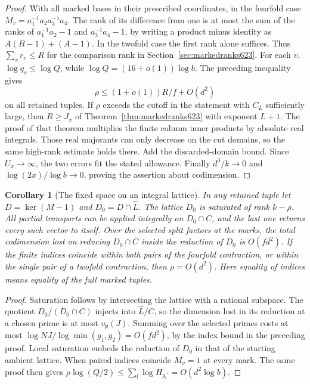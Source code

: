 \documentclass[a4paper,11pt]{article}
\newtheorem{corollary}[proposition]{Corollary}
\theoremstyle{definition}
\theoremstyle{remark}
\numberwithin{equation}{section}
\begin{document}
\begin{proof}
With all marked bases in their prescribed coordinates, in the
fourfold case \(M_v=a_1^{-1}a_2a_3^{-1}a_4\). The rank of its
difference from one is at most the sum of the ranks of
\(a_1^{-1}a_2-1\) and \(a_3^{-1}a_4-1\), by writing a product
minus identity as \(A(B-1)+(A-1)\). In the twofold case the
first rank alone suffices. Thus \(\sum_v r_v\le R\) for the
comparison rank in Section~\ref{sec:markedranks623}. For each
\(v\), \(\log q_v\le\log Q\), while
\(\log Q=(16+o(1))\log b\). The preceding inequality gives
\[
                 \rho\le (1+o(1))R/f+O(d^2)
\]
on all retained tuples. If \(\rho\) exceeds the cutoff in the
statement with \(C_L\) sufficiently large, then \(R\ge J_x\)
of Theorem~\ref{thm:markedranks623} with exponent \(L+1\).
The proof of that theorem multiplies the finite column inner
products by absolute real integrals. Those real majorants can
only decrease on the cut domains, so the same high-rank estimate
holds there. Add the discarded-domain bound. Since \(U_x\to\infty\),
the two errors fit the stated allowance. Finally \(d^3/k\to0\)
and \(\log(2x)/\log b\to0\), proving the assertion about codimension.
\end{proof}

\begin{corollary}[The fixed space on an integral lattice]
\leavevmode\label{cor:rationalfixed629}
In any retained tuple let \(D=\ker(M-1)\) and
\(D_0=D\cap\widehat L\). The lattice \(D_0\) is saturated of
rank \(k-\rho\). All partial transports can be applied integrally
on \(D_0\cap C\), and the last one returns every such vector to
itself. Over the selected split factors at the marks, the total
codimension lost on reducing \(D_0\cap C\) inside the reduction
of \(D_0\) is \(O(fd^2)\). If the finite indices coincide within
both pairs of the fourfold contraction, or within the single pair
of a twofold contraction, then \(\rho=O(d^2)\). Here equality
of indices means equality of the full marked tuples.
\end{corollary}
\begin{proof}
Saturation follows by intersecting the lattice with a rational
subspace. The quotient \(D_0/(D_0\cap C)\) injects into
\(\widehat L/C\), so the dimension lost in its reduction at a
chosen prime is at most \(v_\mathfrak p(J)\). Summing over the
selected primes costs at most
\(\log N J/\log\min(g_1,g_2)=O(fd^2)\), by the index bound in
the preceding proof. Local saturation embeds the reduction of
\(D_0\) in that of the starting ambient lattice. When paired
indices coincide \(M_v=1\) at every mark. The same proof then
gives \(\rho\log(Q/2)\le\sum_l\log H_{g_l'}=O(d^2\log b)\).
\end{proof}
\end{document}
